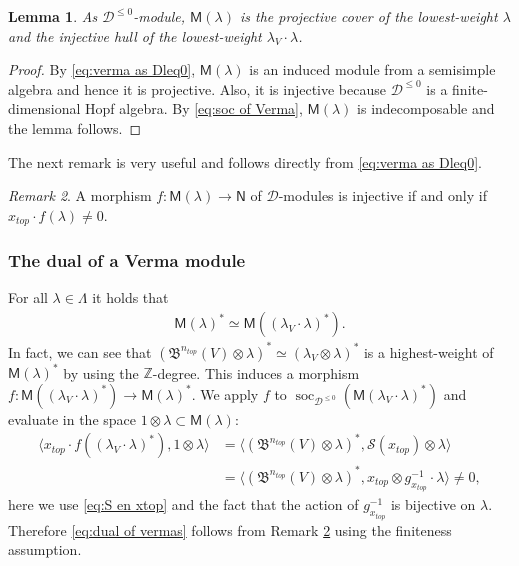 \documentclass[reqno]{amsart}
\newcommand{\cS}{\mathcal{S}}
\newcommand{\xtop}{x_{top}}
\renewcommand{\_}[1]{_{\left( #1 \right)}}
\renewcommand{\^}[1]{^{\left( #1 \right)}}
\newcommand{\ot}{{\otimes}}
\newcommand\fM{\mathsf{M}}
\newcommand\fN{\mathsf{N}}
\newcommand{\Z}{{\mathbb Z}}
\newcommand{\D}{\mathcal{D}}
\newcommand{\BV}{{\mathfrak B}}
\newcommand\soc{\operatorname{soc}_{\D^{\leq0}}}
\theoremstyle{plain}
\newtheorem{lema}{Lemma}[section]
\theoremstyle{definition}
\theoremstyle{remark}
\newtheorem{obs}[lema]{Remark}
\begin{document}
\begin{lema}\label{le:verma is proj cover}
As $\D^{\leq0}$-module, $\fM(\lambda)$ is the projective cover of the lowest-weight $\lambda$ and the injective hull of the lowest-weight $\lambda_V\cdot\lambda$.
\end{lema}

\begin{proof}
By \eqref{eq:verma as Dleq0}, $\fM(\lambda)$ is an induced module from a semisimple algebra and hence it is projective. Also, it is injective because $\D^{\leq0}$ is a finite-dimensional Hopf algebra. By \eqref{eq:soc of Verma}, $\fM(\lambda)$ is indecomposable and the lemma follows.
\end{proof}

The next remark is very useful and follows directly from \eqref{eq:verma as Dleq0}.

\begin{obs}\label{obs:morf inj}
A morphism $f:\fM(\lambda)\rightarrow\fN$ of $\D$-modules is injective if and only if $\xtop\cdot f(\lambda)\neq0$.
\end{obs}


\subsubsection{The dual of a Verma module} For all $\lambda\in\Lambda$ it holds that
\begin{align}\label{eq:dual of vermas}
\fM(\lambda)^*\simeq\fM\left((\lambda_V\cdot\lambda)^*\right).
\end{align}
In fact, we can see that $(\BV^{n_{top}}(V)\ot\lambda)^*\simeq(\lambda_V\ot\lambda)^*$ is a highest-weight of $\fM(\lambda)^*$ by using the $\Z$-degree.
This induces a morphism $f:\fM((\lambda_V\cdot\lambda)^*)\longrightarrow\fM(\lambda)^*$. We apply $f$ to $\soc(\fM(\lambda_V\cdot\lambda)^*)$ and evaluate in the space  $1\ot\lambda\subset\fM(\lambda)$:
\begin{align*}
\langle \xtop\cdot f((\lambda_V\cdot\lambda)^*),1\ot\lambda\rangle&=
\langle(\BV^{n_{top}}(V)\ot\lambda)^*,\cS(\xtop)\ot\lambda\rangle\\
&=\langle(\BV^{n_{top}}(V)\ot\lambda)^*,\xtop\ot g_{\xtop}^{-1}\cdot\lambda\rangle\neq0,
\end{align*}
here we use \eqref{eq:S en xtop} and the fact that the action of $g_{\xtop}^{-1}$ is bijective on $\lambda$. Therefore \eqref{eq:dual of vermas} follows from Remark \ref{obs:morf inj} using the finiteness assumption.
\end{document}
